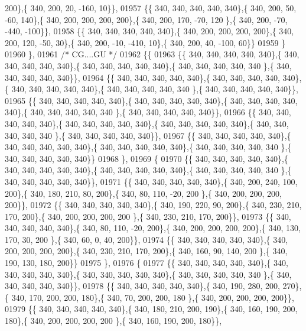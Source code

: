 \begin{DoxyCode}
      200\},\{ 340, 200,  20, -160,  10\}\},
01957 \{\{ 340, 340, 340, 340, 340\},\{ 340, 200,  50, -60, 140\},\{ 340, 200, 200, 200, 200\},\{ 340, 200, 170, -70, 120
      \},\{ 340, 200, -70, -440, -100\}\},
01958 \{\{ 340, 340, 340, 340, 340\},\{ 340, 200, 200, 200, 200\},\{ 340, 200, 120, -50,  30\},\{ 340, 200, -10, -410,  
      10\},\{ 340, 200,  40, -100,  60\}\}
01959 \}
01960 \},
01961 \textcolor{comment}{/* CG....GU */}
01962 \{\{
01963 \{\{ 340, 340, 340, 340, 340\},\{ 340, 340, 340, 340, 340\},\{ 340, 340, 340, 340, 340\},\{ 340, 340, 340, 340, 340
      \},\{ 340, 340, 340, 340, 340\}\},
01964 \{\{ 340, 340, 340, 340, 340\},\{ 340, 340, 340, 340, 340\},\{ 340, 340, 340, 340, 340\},\{ 340, 340, 340, 340, 340
      \},\{ 340, 340, 340, 340, 340\}\},
01965 \{\{ 340, 340, 340, 340, 340\},\{ 340, 340, 340, 340, 340\},\{ 340, 340, 340, 340, 340\},\{ 340, 340, 340, 340, 340
      \},\{ 340, 340, 340, 340, 340\}\},
01966 \{\{ 340, 340, 340, 340, 340\},\{ 340, 340, 340, 340, 340\},\{ 340, 340, 340, 340, 340\},\{ 340, 340, 340, 340, 340
      \},\{ 340, 340, 340, 340, 340\}\},
01967 \{\{ 340, 340, 340, 340, 340\},\{ 340, 340, 340, 340, 340\},\{ 340, 340, 340, 340, 340\},\{ 340, 340, 340, 340, 340
      \},\{ 340, 340, 340, 340, 340\}\}
01968 \},
01969 \{
01970 \{\{ 340, 340, 340, 340, 340\},\{ 340, 340, 340, 340, 340\},\{ 340, 340, 340, 340, 340\},\{ 340, 340, 340, 340, 340
      \},\{ 340, 340, 340, 340, 340\}\},
01971 \{\{ 340, 340, 340, 340, 340\},\{ 340, 200, 240, 100, 200\},\{ 340, 180, 210,  80, 200\},\{ 340,  80, 110, -20, 200
      \},\{ 340, 200, 200, 200, 200\}\},
01972 \{\{ 340, 340, 340, 340, 340\},\{ 340, 190, 220,  90, 200\},\{ 340, 230, 210, 170, 200\},\{ 340, 200, 200, 200, 200
      \},\{ 340, 230, 210, 170, 200\}\},
01973 \{\{ 340, 340, 340, 340, 340\},\{ 340,  80, 110, -20, 200\},\{ 340, 200, 200, 200, 200\},\{ 340, 130, 170,  30, 200
      \},\{ 340,  60,   0,  40, 200\}\},
01974 \{\{ 340, 340, 340, 340, 340\},\{ 340, 200, 200, 200, 200\},\{ 340, 230, 210, 170, 200\},\{ 340, 160,  90, 140, 200
      \},\{ 340, 190, 130, 180, 200\}\}
01975 \},
01976 \{
01977 \{\{ 340, 340, 340, 340, 340\},\{ 340, 340, 340, 340, 340\},\{ 340, 340, 340, 340, 340\},\{ 340, 340, 340, 340, 340
      \},\{ 340, 340, 340, 340, 340\}\},
01978 \{\{ 340, 340, 340, 340, 340\},\{ 340, 190, 280, 200, 270\},\{ 340, 170, 200, 200, 180\},\{ 340,  70, 200, 200, 180
      \},\{ 340, 200, 200, 200, 200\}\},
01979 \{\{ 340, 340, 340, 340, 340\},\{ 340, 180, 210, 200, 190\},\{ 340, 160, 190, 200, 180\},\{ 340, 200, 200, 200, 200
      \},\{ 340, 160, 190, 200, 180\}\},

\end{DoxyCode}
